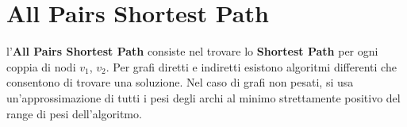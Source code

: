 \chapter{All Pairs Shortest Path}

l'\textbf{All Pairs Shortest Path} consiste nel trovare lo \textbf{Shortest Path} per ogni coppia di nodi $v_1$, $v_2$.
Per grafi diretti e indiretti esistono algoritmi differenti che consentono di trovare una soluzione.
Nel caso di grafi non pesati, si usa un'approssimazione di tutti i pesi degli archi al minimo strettamente positivo del range di pesi dell'algoritmo.
